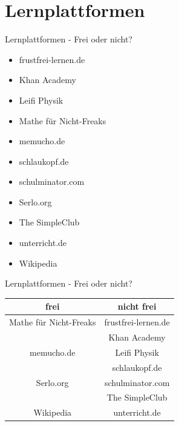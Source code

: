 \documentclass[14pt, usenames, dvipsnames, notes]{beamer}
\begin{document}
\section{Lernplattformen}

	\begin{frame}{Lernplattformen - Frei oder nicht?}
        \begin{minipage}{.5\textwidth}
            \begin{itemize}
                \item frustfrei-lernen.de
                \item Khan Academy
                \item Leifi Physik
                \item Mathe für Nicht-Freaks
                \item memucho.de
            \end{itemize}
        \end{minipage}
        \begin{minipage}{.45\textwidth}
            \begin{itemize}
                \item schlaukopf.de
                \item schulminator.com
                \item Serlo.org
                \item The SimpleClub
                \item unterricht.de
                \item Wikipedia
            \end{itemize}
        \end{minipage}
	\end{frame}
	\begin{frame}{Lernplattformen - Frei oder nicht?}
        \begin{tabularx}{\textwidth}{c|c}
			\textbf{frei} & \textbf{nicht frei} \\
			\hline
			Mathe für Nicht-Freaks & frustfrei-lernen.de \\
			& Khan Academy \\
			memucho.de & Leifi Physik \\
			& schlaukopf.de \\
			Serlo.org & schulminator.com \\
			& The SimpleClub \\
			Wikipedia & unterricht.de \\
		\end{tabularx}
	\end{frame}
\end{document}
